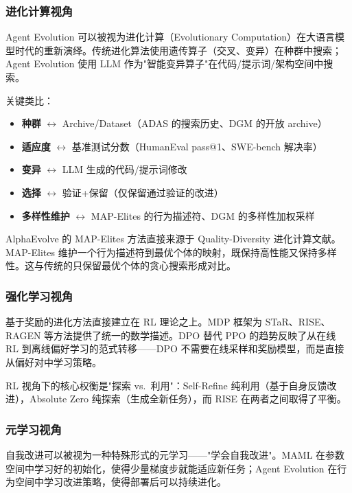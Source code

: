 \subsubsection{进化计算视角}

Agent Evolution 可以被视为进化计算（Evolutionary Computation）在大语言模型时代的重新演绎。传统进化算法使用遗传算子（交叉、变异）在种群中搜索；Agent Evolution 使用 LLM 作为"智能变异算子"在代码/提示词/架构空间中搜索。

关键类比：
\begin{itemize}
\item \textbf{种群} $\leftrightarrow$ Archive/Dataset（ADAS 的搜索历史、DGM 的开放 archive）
\item \textbf{适应度} $\leftrightarrow$ 基准测试分数（HumanEval pass@1、SWE-bench 解决率）
\item \textbf{变异} $\leftrightarrow$ LLM 生成的代码/提示词修改
\item \textbf{选择} $\leftrightarrow$ 验证+保留（仅保留通过验证的改进）
\item \textbf{多样性维护} $\leftrightarrow$ MAP-Elites 的行为描述符、DGM 的多样性加权采样
\end{itemize}

AlphaEvolve 的 MAP-Elites 方法直接来源于 Quality-Diversity 进化计算文献。MAP-Elites 维护一个行为描述符到最优个体的映射，既保持高性能又保持多样性。这与传统的只保留最优个体的贪心搜索形成对比。

\subsubsection{强化学习视角}

基于奖励的进化方法直接建立在 RL 理论之上。MDP 框架为 STaR、RISE、RAGEN 等方法提供了统一的数学描述。DPO 替代 PPO 的趋势反映了从在线 RL 到离线偏好学习的范式转移——DPO 不需要在线采样和奖励模型，而是直接从偏好对中学习策略。

RL 视角下的核心权衡是"探索 vs.\ 利用"：Self-Refine 纯利用（基于自身反馈改进），Absolute Zero 纯探索（生成全新任务），而 RISE 在两者之间取得了平衡。

\subsubsection{元学习视角}

自我改进可以被视为一种特殊形式的元学习——"学会自我改进"。MAML 在参数空间中学习好的初始化，使得少量梯度步就能适应新任务；Agent Evolution 在行为空间中学习改进策略，使得部署后可以持续进化。

